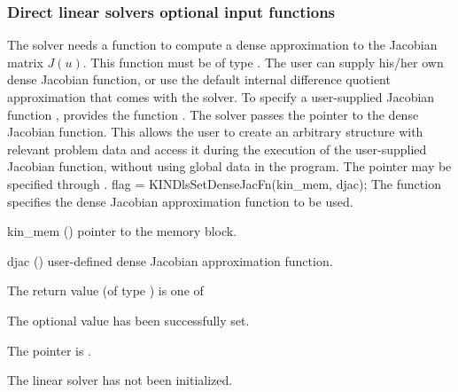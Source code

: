 \subsubsection{Direct linear solvers optional input functions}\label{sss:optin_dls}
The 
{\kindense} solver needs a function to compute a dense approximation to
the Jacobian matrix $J(u)$.  This function must be of type . 
The user can supply his/her own dense Jacobian function, or use the default 
internal difference quotient approximation
that comes with the {\kindense} solver.
To specify a user-supplied Jacobian function , {\kindense} 
provides the function .
The {\kindense} solver passes the pointer  
to the dense Jacobian function. This allows the user to
create an arbitrary structure with relevant problem data and access it
during the execution of the user-supplied Jacobian function, without
using global data in the program.  The pointer  may be
specified through .
{
  flag = KINDlsSetDenseJacFn(kin\_mem, djac);
}
{
  The function  specifies the dense Jacobian
  approximation function to be used.
}
{
  \begin{args}
  \item[kin\_mem] ()
    pointer to the {\kinsol} memory block.
  \item[djac] ()
    user-defined dense Jacobian approximation function.
  \end{args}
}
{
  The return value  (of type ) is one of
  \begin{args}
  \item[\Id{KINDLS\_SUCCESS}] 
    The optional value has been successfully set.
  \item[\Id{KINDLS\_MEM\_NULL}]
    The  pointer is .
  \item[\Id{KINDLS\_LMEM\_NULL}]
    The {\kindense} linear solver has not been initialized.
  \end{args}
}

